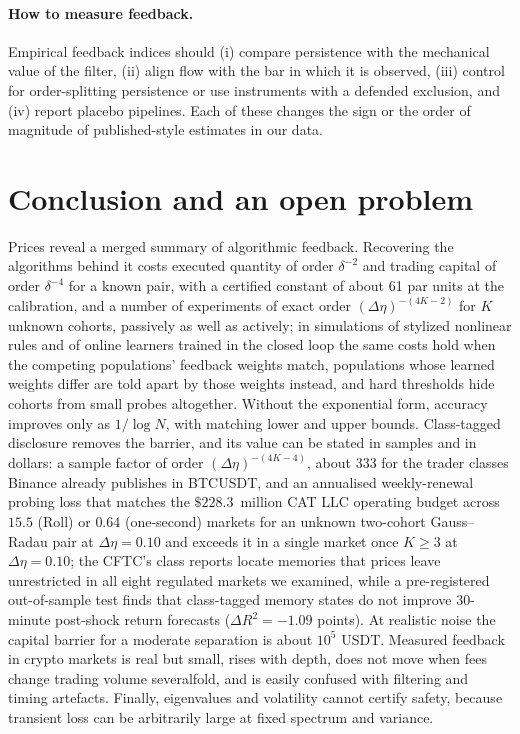 \paragraph{How to measure feedback.} Empirical feedback indices should (i) compare persistence with the mechanical value of the filter, (ii) align flow with the bar in which it is observed, (iii) control for order-splitting persistence or use instruments with a defended exclusion, and (iv) report placebo pipelines. Each of these changes the sign or the order of magnitude of published-style estimates in our data.

\section{Conclusion and an open problem}\label{p1:sec:conclusion}

Prices reveal a merged summary of algorithmic feedback. Recovering the algorithms behind it costs executed quantity of order $\delta^{-2}$ and trading capital of order $\delta^{-4}$ for a known pair, with a certified constant of about 61 par units at the calibration, and a number of experiments of exact order $(\Delta\eta)^{-(4K-2)}$ for $K$ unknown cohorts, passively as well as actively; in simulations of stylized nonlinear rules and of online learners trained in the closed loop the same costs hold when the competing populations' feedback weights match, populations whose learned weights differ are told apart by those weights instead, and hard thresholds hide cohorts from small probes altogether. Without the exponential form, accuracy improves only as $1/\log N$, with matching lower and upper bounds. Class-tagged disclosure removes the barrier, and its value can be stated in samples and in dollars: a sample factor of order $(\Delta\eta)^{-(4K-4)}$, about 333 for the trader classes Binance already publishes in BTCUSDT, and an annualised weekly-renewal probing loss that matches the $\$228.3$~million CAT LLC operating budget across $15.5$ (Roll) or $0.64$ (one-second) markets for an unknown two-cohort Gauss--Radau pair at $\Delta\eta=0.10$ and exceeds it in a single market once $K\ge3$ at $\Delta\eta=0.10$; the CFTC's class reports locate memories that prices leave unrestricted in all eight regulated markets we examined, while a pre-registered out-of-sample test finds that class-tagged memory states do not improve 30-minute post-shock return forecasts ($\Delta R^2=-1.09$ points). At realistic noise the capital barrier for a moderate separation is about $10^5$ USDT. Measured feedback in crypto markets is real but small, rises with depth, does not move when fees change trading volume severalfold, and is easily confused with filtering and timing artefacts. Finally, eigenvalues and volatility cannot certify safety, because transient loss can be arbitrarily large at fixed spectrum and variance.

